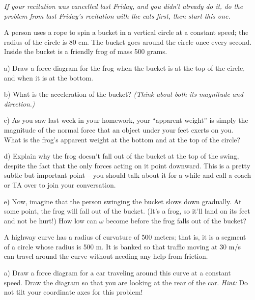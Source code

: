 \documentclass[12pt]{article}
\begin{document}
\Large
\centerline{}
\normalsize
\centerline{}

{\it If your recitation was cancelled last Friday, and you didn't already do it, do the problem from last Friday's recitation with the cats first, then start this one.}




A person uses a rope to spin a bucket in a vertical circle at a constant speed; the radius of the circle is 80 cm. The bucket goes around the circle once every second. Inside the bucket is a friendly frog of mass 500 grams. 


a) Draw a force diagram for the frog when the bucket is at the top of the circle, and when it is at the bottom.

\vspace{2in}

b) What is the acceleration of the bucket? {\it (Think about both its magnitude and direction.)}

\vspace{1in}


c) As you saw last week in your homework, your ``apparent weight'' is simply the magnitude of the normal force that an object under your feet exerts on you. What is the frog's apparent weight at the bottom and at the top of the circle?

\vspace{2in}
\newpage
d) Explain why the frog doesn't fall out of the bucket at the top of the swing, despite the fact that the only forces acting on it point downward. This is a pretty subtle but important point -- you should talk about it for a while and call a coach or TA over to join your conversation.

\vspace{4in}

e) Now, imagine that the person swinging the bucket slows down gradually. At some point, the frog will fall out of the bucket. (It's a frog, so it'll land on its feet and not be hurt!) How low can $\omega$ become before the frog falls out of the bucket?

\newpage


A highway curve has a radius of curvature of 500 meters; that is, it is a segment of a circle whose radius is 500 m. It is banked so that traffic moving at 30 m/s can travel
around the curve without needing any help from friction.


a) Draw a force diagram for a car traveling around this curve at a constant speed. Draw the diagram so that you are looking at the rear of the car. {\it Hint:} Do not tilt your coordinate axes for this problem!
\end{document}
